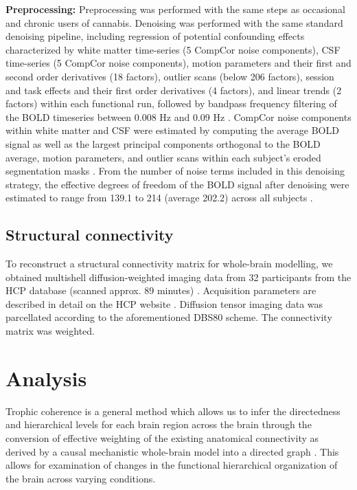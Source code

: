 \textbf{Preprocessing:} Preprocessing was performed with the same steps
as occasional and chronic users of cannabis. Denoising was performed
with the same standard denoising pipeline, including regression of
potential confounding effects characterized by white matter time-series
(5 CompCor noise components), CSF time-series (5 CompCor noise
components), motion parameters and their first and second order
derivatives (18 factors), outlier scans (below 206 factors), session and
task effects and their first order derivatives (4 factors), and linear
trends (2 factors) within each functional run, followed by bandpass
frequency filtering of the BOLD timeseries between 0.008 Hz and 0.09 Hz \parencite{Friston1996,Hallquist2013,Nieto-Castanon2020,Power2014}. CompCor noise components within white matter
and CSF were estimated by computing the average BOLD signal as well as
the largest principal components orthogonal to the BOLD average, motion
parameters, and outlier scans within each subject's eroded segmentation
masks \parencite{Behzadi2007,Chai2012}. From the number of
noise terms included in this denoising strategy, the effective degrees
of freedom of the BOLD signal after denoising were estimated to range
from 139.1 to 214 (average 202.2) across all subjects \parencite{Nieto-Castanon2022a}.
\subsection{Structural connectivity} 
To reconstruct
a structural connectivity matrix for whole-brain modelling, we obtained
multishell diffusion-weighted imaging data from 32 participants from the
HCP database (scanned approx. 89 minutes) \parencite{Kringelbach2023}.
Acquisition parameters are described in detail on the HCP website \parencite{Setsompop2013}. Diffusion tensor imaging data was parcellated
according to the aforementioned DBS80 scheme. The connectivity matrix
was weighted.
\section{Analysis}
Trophic coherence is
a general method which allows us to infer the directedness and
hierarchical levels for each brain region across the brain through the
conversion of effective weighting of the existing anatomical
connectivity as derived by a causal mechanistic whole-brain model into a
directed graph \parencite{MacKay2020, Johnson2014}. This allows for examination of changes in the functional
hierarchical organization of the brain across varying conditions. 

